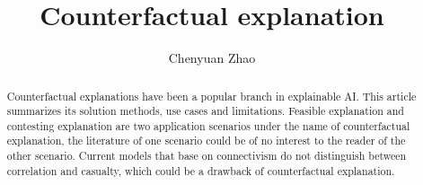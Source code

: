 \documentclass[runningheads]{llncs}
\begin{document}
%
\title{Counterfactual explanation}
%
%
\author{Chenyuan Zhao
}

%
\maketitle              %
%
\begin{abstract}
Counterfactual explanations have been a popular branch in explainable AI. This article summarizes its solution methods, use cases and limitations. Feasible explanation and contesting explanation are two application scenarios under the name of counterfactual explanation, the literature of one scenario could be of no interest to the reader of the other scenario. Current models that base on connectivism do not distinguish between correlation and casualty, which could be a drawback of counterfactual explanation.

\end{abstract}
%

%


%





%
%
% 
% 
%

%
{}
\end{document}
